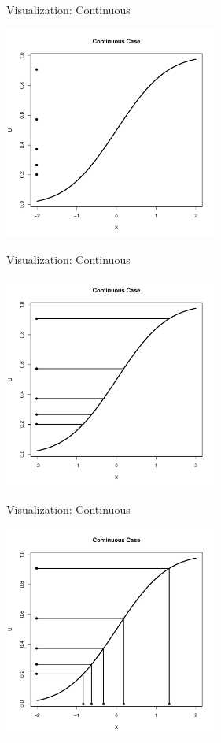 \documentclass
[handout]
{beamer}
\begin{document}
\begin{frame}{Visualization: Continuous}
\begin{center}
\includegraphics[height=7cm]{./Pics/cp1.pdf}
\end{center}
\end{frame}
\begin{frame}{Visualization: Continuous}
\begin{center}
\includegraphics[height=7cm]{./Pics/cp2.pdf}
\end{center}
\end{frame}
\begin{frame}{Visualization: Continuous}
\begin{center}
\includegraphics[height=7cm]{./Pics/cp3.pdf}
\end{center}
\end{frame}
\end{document}
